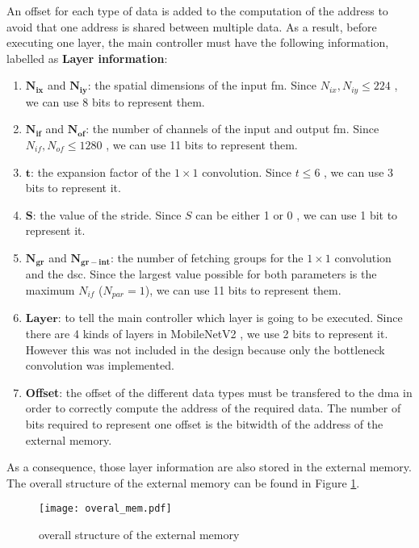 An offset for each type of data is added to the computation of the address to avoid that one address is shared between multiple data. As a result, before executing one layer, the main controller must have the following information, labelled as \textbf{Layer information}:
%
\begin{enumerate}
    \item $\boldsymbol{N_{ix}}$ and $\boldsymbol{N_{iy}}$: the spatial dimensions of the input \acrshort{fm}. Since $N_{ix}, N_{iy} \leq 224$ \cite{sandler_mobilenetv2_2018}, we can use 8 bits to represent them.
    \item $\boldsymbol{N_{if}}$ and $\boldsymbol{N_{of}}$: the number of channels of the input  and output \acrshort{fm}. Since $N_{if}, N_{of} \leq 1280$ \cite{sandler_mobilenetv2_2018}, we can use 11 bits to represent them.
    \item $\boldsymbol{t}$: the expansion factor of the $1 \times 1$ convolution. Since $t \leq 6$ \cite{sandler_mobilenetv2_2018}, we can use 3 bits to represent it.
    \item $\boldsymbol{S}$: the value of the stride. Since $S$ can be either 1 or 0 \cite{sandler_mobilenetv2_2018}, we can use 1 bit to represent it.
    \item $\boldsymbol{N_{gr}}$ and $\boldsymbol{N_{gr-int}}$: the number of fetching groups for the $1 \times 1$ convolution and the \acrshort{dsc}. Since the largest value possible for both parameters is the maximum $N_{if}$ ($N_{par} = 1$), we can use 11 bits to represent them.
    \item $\boldsymbol{Layer}$: to tell the main controller which layer is going to be executed. Since there are 4 kinds of layers in MobileNetV2 \cite{sandler_mobilenetv2_2018}, we use 2 bits to represent it. However this was not included in the design because only the bottleneck convolution was implemented.
    \item \textbf{Offset}: the offset of the different data types must be transfered to the \acrshort{dma} in order to correctly compute the address of the required data. The number of bits required to represent one offset is the bitwidth of the address of the external memory.
\end{enumerate}
%
As a consequence, those layer information are also stored in the external memory. The overall structure of the external memory can be found in Figure \ref{fig:overal_mem}.
%
\begin{figure}[H]
    \centering
    \texttt{[image: overal\_mem.pdf]}
    \caption{overall structure of the external memory}
    \label{fig:overal_mem}
\end{figure}
